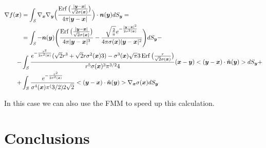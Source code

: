 \documentclass[11pt]{article}
\numberwithin{equation}{section}
\newcommand{\vct}{\vectorsym}
\DeclareMathOperator\erf{Erf}
\newcommand\bx{\vct{x}}
\newcommand\by{\vct{y}}
\newcommand\bn{\boldsymbol n}
\begin{document}
\begin{equation}
\begin{aligned}
\nabla f(\bx)&=\int_{\mathit{S}}\nabla_{\bx}\nabla_{\by}\Big(\frac{\erf\big(\frac{|\by-\bx|}{\sqrt{2}\sigma(\bx)}\big)}{4\pi|\by-\bx|}\Big)\cdot\bn(\by)dS_{\by}=\\
&=\int_{\mathit{S}}-\bn(\by)\Bigg(\frac{\erf\big(\frac{|\by-\bx|}{\sqrt{2}\sigma(\bx)}\big)}{4\pi|\by-\bx|^3}-\frac{\sqrt{\frac{2}{\pi}}e^{-\frac{|\by-\bx|^2}{2\sigma^2(\bx)}}}{4\pi\sigma(\bx)|\by-\bx|^2}\Bigg)dS_{\by}-\\
-&\int_{\mathit{S}} \frac{e^{-\frac{r^2}{2\sigma^2(\bx)}}(\sqrt{2}r^3+\sqrt{2}r\sigma^2(\bx)3)-\sigma^3(\bx)\sqrt{\pi}3\erf{\big(\frac{r}{\sqrt{2}\sigma(\bx)}}\big)}{r^5\sigma(\bx)^3\pi^{3/2}4}(\bx-\by)<(\by-\bx)\cdot \hat{\bn}(\by)>dS_{\by}+\\
+&\int_{\mathit{S}} \frac{e^{-\frac{r^2}{2\sigma^2(\bx)}}}{\sigma^4(\bx)\pi^(3/2)2\sqrt{2}}<(\by-\bx)\cdot \hat{\bn}(\by)>\nabla_{\bx}\sigma(\bx)dS_{\by}
\end{aligned}
\end{equation}

In this case we can also use the FMM to speed up this calculation.






\section{Conclusions}































  
\end{document}
